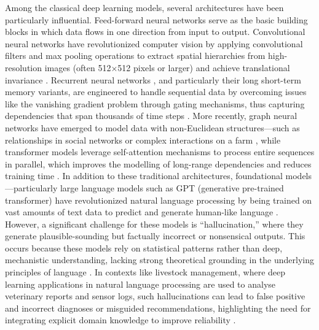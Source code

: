 Among the classical deep learning models, several architectures have been particularly influential. Feed-forward neural networks serve as the basic building blocks in which data flows in one direction from input to output. Convolutional neural networks  have revolutionized computer vision by applying convolutional filters and max pooling operations to extract spatial hierarchies from high-resolution images (often 512×512 pixels or larger) and achieve translational invariance \cite{lecun1998gradient, krizhevsky2012imagenet}. Recurrent neural networks , and particularly their long short-term memory  variants, are engineered to handle sequential data by overcoming issues like the vanishing gradient problem through gating mechanisms, thus capturing dependencies that span thousands of time steps 
\cite{hochreiter1997long, graves2005framewise}. More recently, graph neural networks have emerged to model data with non-Euclidean structures—such as relationships in social networks or complex interactions on a farm \cite{scarselli2009graph}, while transformer models leverage self-attention mechanisms to process entire sequences in parallel, which improves the modelling of long-range dependencies and reduces training time \cite{vaswani2017attention}. In addition to these traditional architectures, foundational models—particularly large language models such as GPT (generative pre-trained transformer) have revolutionized natural language processing by being trained on vast amounts of text data to predict and generate human-like language \cite{brown2020language}. However, a significant challenge for these models is “hallucination,” where they generate plausible-sounding but factually incorrect or nonsensical outputs. This occurs because these models rely on statistical patterns rather than deep, mechanistic understanding, lacking strong theoretical grounding in the underlying principles of language \cite{marcus2020gpt3, bender2021stochastic}. In contexts like livestock management, where deep learning applications in natural language processing are used to analyse veterinary reports and sensor logs, such hallucinations can lead to false positive and incorrect diagnoses or misguided recommendations, highlighting the need for integrating explicit domain knowledge to improve reliability \cite{smith2020nlp}.

